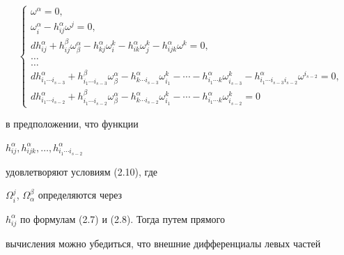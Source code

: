 \begin{equation} 


\left\{ 


\begin{array}{l} 


\omega^\alpha=0,\\ 


\omega^\alpha_i-h^\alpha_{ij}\omega^j=0,\\ 


dh^\alpha_{ij}+h^\beta_{ij}\omega^\alpha_\beta- 


h^\alpha_{kj}\omega^k_i- 


h^\alpha_{ik}\omega^k_j-h^\alpha_{ijk}\omega^k=0,\\ 


\dots\\


\dots\\


dh^\alpha_{i_1\dotsb i_{s-3}}+ 


h^\beta_{i_1\dotsb i_{s-3}}\omega^\alpha_\beta- 


h^\alpha_{k\dotsb i_{s-3}}\omega^k_{i_1}-\dotsb -


h^\alpha_{i_1\dotsb k}\omega^k_{i_{s-3}}- 


h^\alpha_{i_1\dotsb i_{s-3}i_{s-2}}\omega^{i_{s-2}}=0,\\ 


%


dh^\alpha_{i_1\dotsb i_{s-2}}+ 


h^\beta_{i_1\dotsb i_{s-2}}\omega^\alpha_\beta- 


h^\alpha_{k\dotsb i_{s-2}}\omega^k_{i_1}- \dotsb -


h^\alpha_{i_1\dotsb k}\omega^k_{i_{s-2}}=0 


\end{array} 


\right. 


\end{equation} 


в предположении, что функции 


$h^\alpha_{ij},h^\alpha_{ijk},\dotsc,h^\alpha_{i_1\dotsb i_{s-2}}$ 


удовлетворяют условиям (2.10), где 


$\Omega^j_i$, $\Omega^\beta_\alpha$ определяются через


$h^\alpha_{ij}$ по формулам (2.7) и (2.8). Тогда путем прямого 


вычисления можно убедиться, что внешние дифференциалы левых частей 


